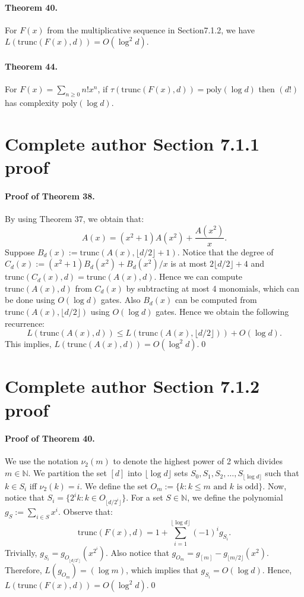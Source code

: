 \documentclass[10pt,a4paper]{article}
\begin{document}
\paragraph{Theorem 40.} For $F(x)$ from the multiplicative sequence in Section7.1.2, we have $L(\mathrm{trunc}(F(x),d))=O(\log^2d)$.
\paragraph{Theorem 44.} For $F(x)=\sum_{n\ge0}n!x^n$, if $\tau(\mathrm{trunc}(F(x),d))=\mathrm{poly}(\log d)$ then $(d!)$ has complexity $\mathrm{poly}(\log d)$.

\section*{Complete author Section 7.1.1 proof}
\paragraph{Proof of Theorem 38.} By using Theorem 37, we obtain that:
\[A(x)=(x^2+1)A(x^2)+\frac{A(x^2)}x.\tag{3}\]
Suppose $B_d(x):=\mathrm{trunc}(A(x),\lfloor d/2\rfloor+1)$. Notice that the degree of $C_d(x):=(x^2+1)B_d(x^2)+B_d(x^2)/x$ is at most $2\lfloor d/2\rfloor+4$ and $\mathrm{trunc}(C_d(x),d)=\mathrm{trunc}(A(x),d)$. Hence we can compute $\mathrm{trunc}(A(x),d)$ from $C_d(x)$ by subtracting at most 4 monomials, which can be done using $O(\log d)$ gates. Also $B_d(x)$ can be computed from $\mathrm{trunc}(A(x),\lfloor d/2\rfloor)$ using $O(\log d)$ gates. Hence we obtain the following recurrence:
\[L(\mathrm{trunc}(A(x),d))\le L(\mathrm{trunc}(A(x),\lfloor d/2\rfloor))+O(\log d).\]
This implies, $L(\mathrm{trunc}(A(x),d))=O(\log^2d)$.\qed
\section*{Complete author Section 7.1.2 proof}
\paragraph{Proof of Theorem 40.} We use the notation $\nu_2(m)$ to denote the highest power of 2 which divides $m\in\mathbb N$. We partition the set $[d]$ into $\lfloor\log d\rfloor$ sets $S_0,S_1,S_2,\ldots,S_{\lfloor\log d\rfloor}$ such that $k\in S_i$ iff $\nu_2(k)=i$. We define the set $O_m:=\{k:k\le m\text{ and }k\text{ is odd}\}$. Now, notice that $S_i=\{2^ik:k\in O_{\lfloor d/2^i\rfloor}\}$. For a set $S\in\mathbb N$, we define the polynomial $g_S:=\sum_{i\in S}x^i$. Observe that:
\[\mathrm{trunc}(F(x),d)=1+\sum_{i=1}^{\lfloor\log d\rfloor}(-1)^ig_{S_i}.\]
Trivially, $g_{S_i}=g_{O_{\lfloor d/2^i\rfloor}}(x^{2^i})$. Also notice that $g_{O_m}=g_{[m]}-g_{\lfloor m/2\rfloor}(x^2)$. Therefore, $L(g_{O_m})=(\log m)$, which implies that $g_{S_i}=O(\log d)$. Hence, $L(\mathrm{trunc}(F(x),d))=O(\log^2d)$.\qed
\end{document}
